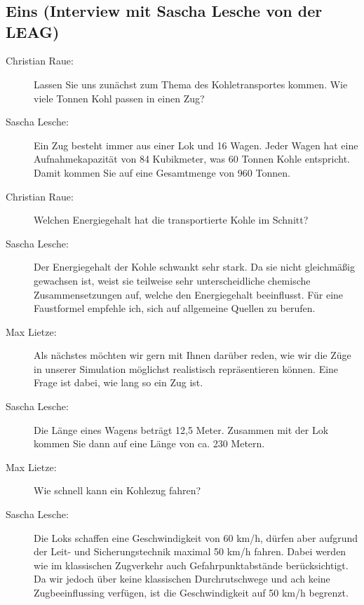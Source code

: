 \chapter{\appendixname}

\section*{Eins (Interview mit Sascha Lesche von der LEAG)}

\begin{description}

    \item[Christian Raue:] Lassen Sie uns zunächst zum Thema des Kohletransportes kommen. Wie viele Tonnen Kohl passen in einen Zug?

    \item[Sascha Lesche:] Ein Zug besteht immer aus einer Lok und 16 Wagen. Jeder Wagen hat eine Aufnahmekapazität von 84 Kubikmeter, was 60 Tonnen Kohle entspricht. Damit kommen Sie auf eine Gesamtmenge von 960 Tonnen.

    \item[Christian Raue:] Welchen Energiegehalt hat die transportierte Kohle im Schnitt?

    \item[Sascha Lesche:] Der Energiegehalt der Kohle schwankt sehr stark. Da sie nicht gleichmäßig gewachsen ist, weist sie teilweise sehr unterscheidliche chemische Zusammensetzungen auf, welche den Energiegehalt beeinflusst. Für eine Faustformel empfehle ich, sich auf allgemeine Quellen zu berufen.

    \item[Max Lietze:] Als nächstes möchten wir gern mit Ihnen darüber reden, wie wir die Züge in unserer Simulation möglichst realistisch repräsentieren können. Eine Frage ist dabei, wie lang so ein Zug ist.

    \item[Sascha Lesche:] Die Länge eines Wagens beträgt 12,5 Meter. Zusammen mit der Lok kommen Sie dann auf eine Länge von ca. 230 Metern.

    \item[Max Lietze:] Wie schnell kann ein Kohlezug fahren?

    \item[Sascha Lesche:] Die Loks schaffen eine Geschwindigkeit von 60 km/h, dürfen aber aufgrund der Leit- und Sicherungstechnik maximal 50 km/h fahren. Dabei werden wie im klassischen Zugverkehr auch Gefahrpunktabstände berücksichtigt. Da wir jedoch über keine klassischen Durchrutschwege und ach keine Zugbeeinflussing verfügen, ist die Geschwindigkeit auf 50 km/h begrenzt.


\end{description}
